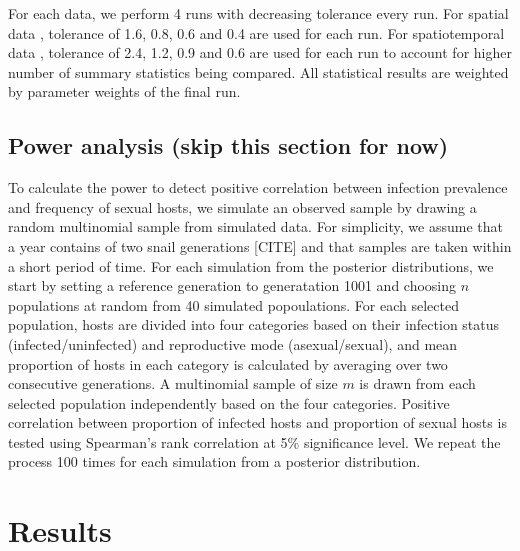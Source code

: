 \documentclass{article}\usepackage[]{graphicx}\usepackage[]{color}
\begin{document}
For each data, we perform 4 runs with decreasing tolerance every run.
For spatial data \citep{dagan2013clonal, mckone2016fine}, tolerance of 1.6, 0.8, 0.6 and 0.4 are used for each run.
For spatiotemporal data \citep{vergara2014infection}, tolerance of 2.4, 1.2, 0.9 and 0.6 are used for each run to account for higher number of summary statistics being compared.
All statistical results are weighted by parameter weights of the final run.

\subsection{Power analysis (skip this section for now)}


To calculate the power to detect positive correlation between infection prevalence and frequency of sexual hosts, we simulate an observed sample by drawing a random multinomial sample from simulated data.
For simplicity, we assume that a year contains of two snail generations [CITE] and that samples are taken within a short period of time.
For each simulation from the posterior distributions, we start by setting a reference generation to generatation 1001 and choosing $n$ populations at random from 40 simulated popoulations.
For each selected population, hosts are divided into four categories based on their infection status (infected/uninfected) and reproductive mode (asexual/sexual),
and mean proportion of hosts in each category is calculated by averaging over two consecutive generations.
A multinomial sample of size $m$ is drawn from each selected population independently based on the four categories. 
Positive correlation between proportion of infected hosts and proportion of sexual hosts is tested using Spearman's rank correlation at 5\% significance level.
We repeat the process 100 times for each simulation from a posterior distribution.

\section{Results}
\end{document}
